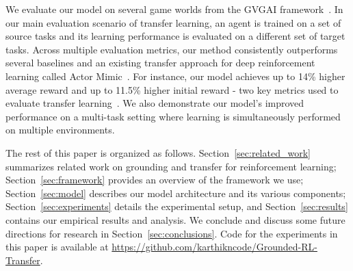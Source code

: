 We evaluate our model on several game worlds from the GVGAI framework~. In our main evaluation scenario of transfer learning, an agent is trained on a set of source tasks and its learning performance is evaluated on a different set of target tasks. Across multiple evaluation metrics, our method consistently outperforms several baselines and an existing transfer approach for deep reinforcement learning called Actor Mimic~\cite{parisotto2016actor}. For instance, our model achieves up to 14\% higher average reward and up to 11.5\% higher initial reward - two key metrics used to evaluate transfer learning~.  We also demonstrate our model's improved performance on a multi-task setting where learning is simultaneously performed on multiple environments.


The rest of this paper is organized as follows. Section~\ref{sec:related_work} summarizes related work on grounding and transfer for reinforcement learning; Section~\ref{sec:framework} provides an overview of the framework we use; Section~\ref{sec:model} describes our model architecture and its various components; Section~\ref{sec:experiments} details the experimental setup, and Section~\ref{sec:results} contains our empirical results and analysis. We conclude and discuss some future directions for research in Section~\ref{sec:conclusions}. Code for the experiments in this paper is available at \url{https://github.com/karthikncode/Grounded-RL-Transfer}.

